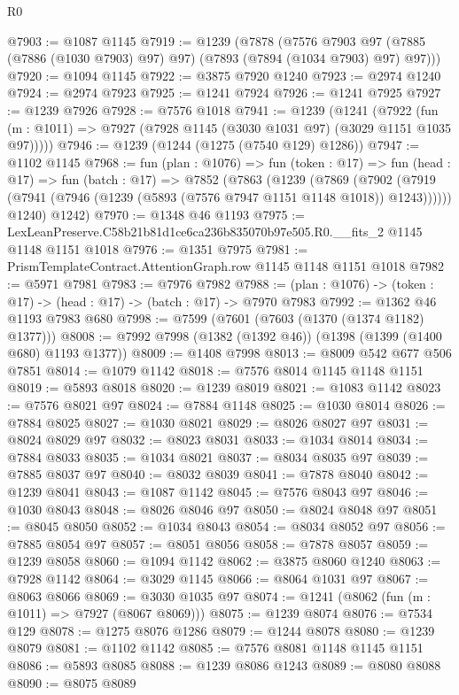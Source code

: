 \begin{lexlean}{R0}
\begin{coremodule}
@7903 := @1087 @1145
@7919 := @1239
    (@7878
      (@7576 @7903 @97 (@7885 (@7886 (@1030 @7903) @97) @97) (@7893 (@7894 (@1034 @7903) @97) @97)))
@7920 := @1094 @1145
@7922 := @3875 @7920 @1240
@7923 := @2974 @1240
@7924 := @2974 @7923
@7925 := @1241 @7924
@7926 := @1241 @7925
@7927 := @1239 @7926
@7928 := @7576 @1018
@7941 := @1239
    (@1241
      (@7922 (fun (m : @1011) => @7927 (@7928 @1145 (@3030 @1031 @97) (@3029 @1151 @1035 @97)))))
@7946 := @1239 (@1244 (@1275 (@7540 @129) @1286))
@7947 := @1102 @1145
@7968 := fun (plan : @1076) =>
  fun (token : @17) =>
  fun (head : @17) =>
  fun (batch : @17) =>
  @7852
    (@7863
      (@1239
        (@7869
          (@7902 (@7919 (@7941 (@7946 (@1239 (@5893 (@7576 @7947 @1151 @1148 @1018)) @1243))))))
        @1240)
      @1242)
@7970 := @1348 @46 @1193
@7975 := LexLeanPreserve.C58b21b81d1ce6ca236b835070b97e505.R0.__fits_2 @1145 @1148 @1151 @1018
@7976 := @1351 @7975
@7981 := PrismTemplateContract.AttentionGraph.row @1145 @1148 @1151 @1018
@7982 := @5971 @7981
@7983 := @7976 @7982
@7988 := (plan : @1076) -> (token : @17) -> (head : @17) -> (batch : @17) -> @7970 @7983
@7992 := @1362 @46 @1193 @7983 @680
@7998 := @7599 (@7601 (@7603 (@1370 (@1374 @1182) @1377)))
@8008 := @7992 @7998 (@1382 (@1392 @46)) (@1398 (@1399 (@1400 @680) @1193 @1377))
@8009 := @1408 @7998
@8013 := @8009 @542 @677 @506 @7851
@8014 := @1079 @1142
@8018 := @7576 @8014 @1145 @1148 @1151
@8019 := @5893 @8018
@8020 := @1239 @8019
@8021 := @1083 @1142
@8023 := @7576 @8021 @97
@8024 := @7884 @1148
@8025 := @1030 @8014
@8026 := @7884 @8025
@8027 := @1030 @8021
@8029 := @8026 @8027 @97
@8031 := @8024 @8029 @97
@8032 := @8023 @8031
@8033 := @1034 @8014
@8034 := @7884 @8033
@8035 := @1034 @8021
@8037 := @8034 @8035 @97
@8039 := @7885 @8037 @97
@8040 := @8032 @8039
@8041 := @7878 @8040
@8042 := @1239 @8041
@8043 := @1087 @1142
@8045 := @7576 @8043 @97
@8046 := @1030 @8043
@8048 := @8026 @8046 @97
@8050 := @8024 @8048 @97
@8051 := @8045 @8050
@8052 := @1034 @8043
@8054 := @8034 @8052 @97
@8056 := @7885 @8054 @97
@8057 := @8051 @8056
@8058 := @7878 @8057
@8059 := @1239 @8058
@8060 := @1094 @1142
@8062 := @3875 @8060 @1240
@8063 := @7928 @1142
@8064 := @3029 @1145
@8066 := @8064 @1031 @97
@8067 := @8063 @8066
@8069 := @3030 @1035 @97
@8074 := @1241 (@8062 (fun (m : @1011) => @7927 (@8067 @8069)))
@8075 := @1239 @8074
@8076 := @7534 @129
@8078 := @1275 @8076 @1286
@8079 := @1244 @8078
@8080 := @1239 @8079
@8081 := @1102 @1142
@8085 := @7576 @8081 @1148 @1145 @1151
@8086 := @5893 @8085
@8088 := @1239 @8086 @1243
@8089 := @8080 @8088
@8090 := @8075 @8089

\end{coremodule}
\end{lexlean}
